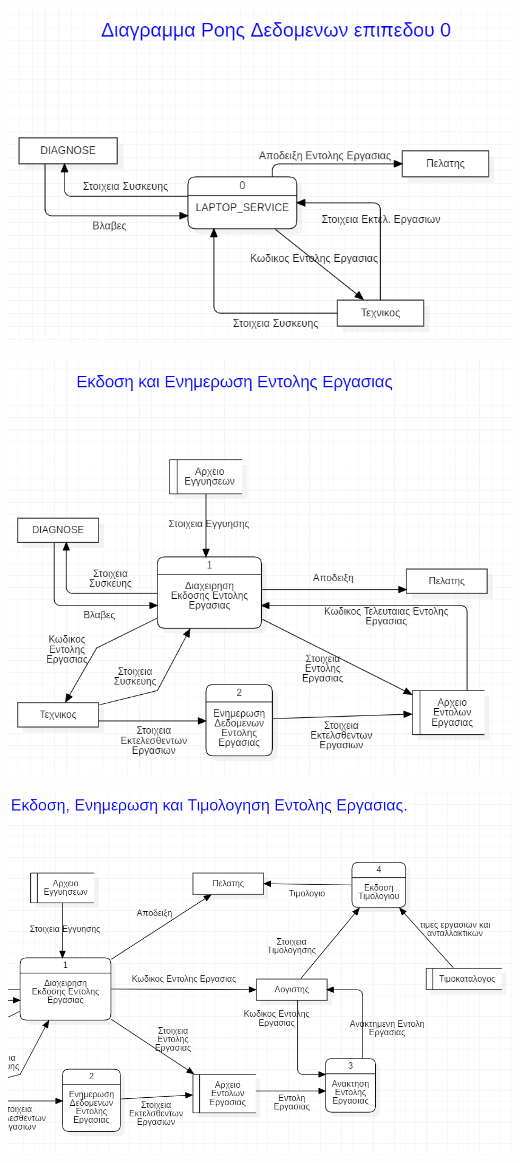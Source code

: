 \documentclass[12pt]{article}
\begin{document}
\begin{center}
\includegraphics[scale=1]{MerosB/B1}
\end{center}
\begin{center}
\includegraphics[scale=1]{MerosB/B2}
\end{center}
\begin{center}
\includegraphics[scale=0.8]{MerosB/B3}
\end{center}
\end{document}
